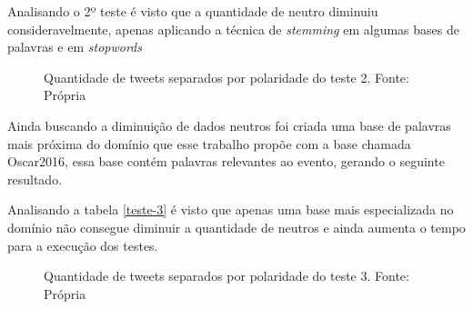 Analisando o 2º teste é visto que a quantidade de neutro diminuiu consideravelmente, apenas aplicando a técnica de \textit{stemming} em algumas bases de palavras e em \textit{stopwords}
\begin{figure}[!h]
	\centering{}
	\caption{Quantidade de tweets separados por polaridade do teste 2. Fonte: Própria}
	\label{teste-graf-2}
\end{figure}

Ainda buscando a diminuição de dados neutros foi criada uma base de palavras mais próxima do domínio que esse trabalho propõe com a base chamada Oscar2016, essa base contém palavras relevantes ao evento, gerando o seguinte resultado.

\begin{table}[]
	\caption{3º teste}
	\label{teste-3}
\end{table}

Analisando a tabela \ref{teste-3} é visto que apenas uma base mais especializada no domínio não consegue diminuir a quantidade de neutros e ainda aumenta o tempo para a execução dos testes.
\begin{figure}[!h]
	\centering{}
	\caption{Quantidade de tweets separados por polaridade do teste 3. Fonte: Própria}
	\label{teste-graf-3}
\end{figure}

